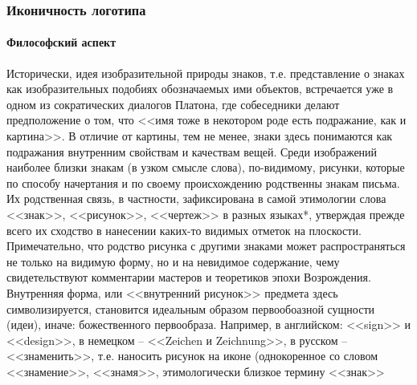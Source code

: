 \subsubsection{Иконичность логотипа}

\paragraph{Философский аспект}

Исторически, идея изобразительной природы знаков, т.е. представление о знаках
как изобразительных подобиях обозначаемых ими объектов, встречается уже в
одном из сократических диалогов Платона, где собеседники делают предположение о
том, что <<имя тоже в некотором роде есть подражание, как и картина>>\autocite{kratil2013}. В
отличие от картины, тем  не менее, знаки здесь понимаются как подражания внутренним свойствам и
качествам вещей. Среди изображений наиболее близки знакам (в узком смысле слова), по-видимому,
рисунки, которые по способу начертания и по своему происхождению родственны знакам письма. Их
родственная связь, в частности, зафиксирована в самой этимологии слова <<знак>>, <<рисунок>>,
<<чертеж>> в разных языках*, утверждая прежде всего их сходство в нанесении каких-то видимых отметок на
плоскости. Примечательно, что родство рисунка с другими знаками может распространяться не только на
видимую форму, но и на невидимое содержание, чему свидетельствуют комментарии мастеров и теоретиков
эпохи Возрождения\autocite[][527-535]{zukarro1981}. Внутренняя форма, или <<внутренний
рисунок>> предмета здесь символизируется, становится идеальным образом первообоазной сущности (идеи),
иначе: божественного первообраза. Например, в английском: <<sign>> и <<design>>, в немецком –
<<Zeichen и Zeichnung>>,  в русском – <<знаменить>>, т.е. наносить рисунок на иконе (однокоренное со
словом <<знамение>>, <<знамя>>, этимологически близкое термину <<знак>> \autocite[][140]{chertov1993}

